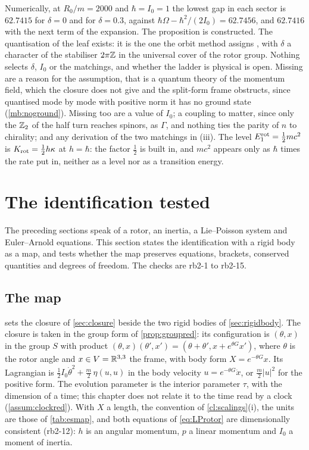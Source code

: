 Numerically, at $R_0/m=2000$ and $\hbar=I_0=1$ the lowest gap in each sector is $62.7415$ for $\delta=0$ and for $\delta=0.3$, against
$\hbar\Omega-\hbar^2/(2I_0)=62.7456$, and $62.7416$ with the next term of the expansion. The proposition is constructed. The quantisation of the
leaf exists: it is the one the orbit method assigns \cite{Kirillov04}, with $\delta$ a character of the stabiliser $2\pi\mathbb{Z}$ in the universal
cover of the rotor group. Nothing selects $\delta$, $I_0$ or the matchings, and whether the ladder is physical is open. Missing are a reason for
the assumption, that is a quantum theory of the momentum field, which the closure does not give and the split-form frame obstructs, since quantised
mode by mode with positive norm it has no ground state (\cref{mb:noground}). Missing too are
a value of $I_0$; a coupling to matter, since only the $\mathbb{Z}_2$ of the half turn reaches spinors, as $\Gamma$, and nothing ties the parity of $n$ to
chirality; and any derivation of the two matchings in (iii). The level $E^{\rm rot}_1=\tfrac12mc^2$ is $K_{\rm rot}=\tfrac12h\kappa$ at $h=\hbar$: the
factor $\tfrac12$ is built in, and $mc^2$ appears only as $\hbar$ times the rate put in, neither as a level nor as a transition energy.

\section{The identification tested}
\label{sec:esmap}

The preceding sections speak of a rotor, an inertia, a Lie--Poisson system and Euler--Arnold equations. This section states the
identification with a rigid body as a map, and tests whether the map preserves equations, brackets, conserved quantities and degrees of freedom.
The checks are rb2-1 to rb2-15.

\subsection{The map}
\label{sec:esmap:map}

 sets the closure of \cref{sec:closure} beside the two rigid bodies of \cref{sec:rigidbody}. The closure is taken in the group
form of \cref{prop:groupred}: its configuration is $(\theta,x)$ in the group $S$ with product $(\theta,x)(\theta',x')=(\theta+\theta',x+e^{\theta G}x')$,
where $\theta$ is the rotor angle and $x\in V=\mathbb{R}^{3,3}$ the frame, with body form $X=e^{-\theta G}x$. Its Lagrangian is
$\tfrac12I_0\dot\theta^2+\tfrac m2\,\eta(u,u)$ in the body velocity $u=e^{-\theta G}\dot x$, or $\tfrac m2|u|^2$ for the positive form. The evolution
parameter is the interior parameter $\tau$, with the dimension of a time; this chapter does not relate it to the time read by a clock
(\cref{assum:clockred}).
With $X$ a length, the convention of \cref{cl:scalings}(i), the units are those of \cref{tab:esmap}, and both equations of \eqref{eq:LProtor}
are dimensionally consistent (rb2-12): $h$ is an angular momentum, $p$ a linear momentum and $I_0$ a moment of inertia.

